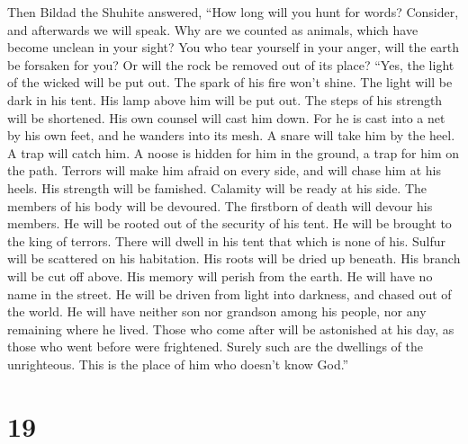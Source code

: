  Then Bildad the Shuhite answered,  ``How
long will you hunt for words? Consider, and afterwards we will speak.
 Why are we counted as animals, which have become unclean
in your sight?  You who tear yourself in your anger, will
the earth be forsaken for you? Or will the rock be removed out of its
place?  ``Yes, the light of the wicked will be put out.
The spark of his fire won't shine.  The light will be dark
in his tent. His lamp above him will be put out.  The
steps of his strength will be shortened. His own counsel will cast him
down.  For he is cast into a net by his own feet, and he
wanders into its mesh.  A snare will take him by the heel.
A trap will catch him.  A noose is hidden for him in the
ground, a trap for him on the path.  Terrors will make
him afraid on every side, and will chase him at his heels.
 His strength will be famished. Calamity will be ready at
his side.  The members of his body will be devoured. The
firstborn of death will devour his members.  He will be
rooted out of the security of his tent. He will be brought to the king
of terrors.  There will dwell in his tent that which is
none of his. Sulfur will be scattered on his habitation. 
His roots will be dried up beneath. His branch will be cut off above.
 His memory will perish from the earth. He will have no
name in the street.  He will be driven from light into
darkness, and chased out of the world.  He will have
neither son nor grandson among his people, nor any remaining where he
lived.  Those who come after will be astonished at his
day, as those who went before were frightened.  Surely
such are the dwellings of the unrighteous. This is the place of him who
doesn't know God.''

\hypertarget{section-18}{%
\section{19}\label{section-18}}

